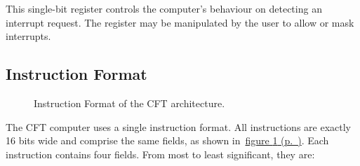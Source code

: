 \documentclass[11pt,a4paper,twocolumns]{article}
\newcommand{\cf}[2][section]{\hyperref[#2]{#1 \ref*{#2} (p.~\pageref*{#2})}}
\newcommand{\fcf}[1]{\cf[figure]{#1}}
\begin{document}
This single-bit register controls the computer's behaviour on
detecting an interrupt request. The register may be manipulated by the
user to allow or mask interrupts.



\subsection{Instruction Format}
\label{sec-if}

\begin{figure}[tb]
  \centering


  \caption{\label{fig-if}Instruction Format of the CFT architecture.}
\end{figure}

The CFT computer uses a single instruction format. All instructions are exactly
16 bits wide and comprise the same fields, as shown in~\fcf{fig-if}. Each
instruction contains four fields. From most to least significant, they are:
\end{document}

